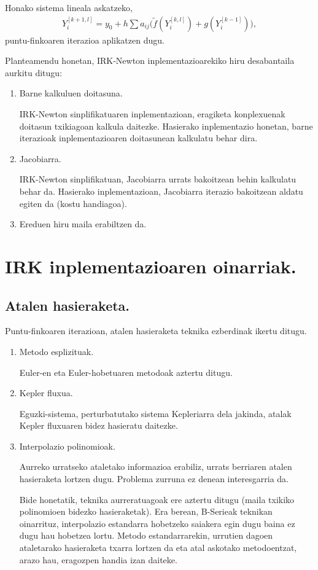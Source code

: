 Honako sistema lineala askatzeko,
\begin{align*}
Y_i^{[k+1,l]}=y_0+ h \sum a_{ij} \big( \tilde{f}(Y_i^{[k,l]})+g(Y_i^{[k-1]})),
\end{align*}
puntu-finkoaren iterazioa aplikatzen dugu.

Planteamendu honetan, IRK-Newton inplementazioarekiko hiru desabantaila aurkitu ditugu: 
\begin{enumerate}
\item Barne kalkuluen doitasuna. 

IRK-Newton sinplifikatuaren inplementazioan, eragiketa konplexuenak doitasun txikiagoan kalkula daitezke. Hasierako inplementazio honetan, barne iterazioak inplementazioaren doitasunean kalkulatu behar dira.

\item Jacobiarra.

IRK-Newton sinplifikatuan, Jacobiarra urrats bakoitzean behin kalkulatu behar da. Hasierako inplementazioan, Jacobiarra iterazio bakoitzean  aldatu egiten da (kostu handiagoa).
\item Ereduen hiru maila erabiltzen da.\\
\end{enumerate}

\section{IRK inplementazioaren oinarriak.}


\subsection*{Atalen hasieraketa.}

Puntu-finkoaren iterazioan, atalen hasieraketa teknika ezberdinak ikertu ditugu. 
\begin{enumerate}
\item Metodo esplizituak.

Euler-en eta Euler-hobetuaren metodoak aztertu ditugu.

\item Kepler fluxua.

Eguzki-sistema, perturbatutako sistema Kepleriarra dela jakinda, atalak Kepler fluxuaren bidez hasieratu daitezke.

\item Interpolazio polinomioak.

Aurreko urratseko ataletako informazioa erabiliz, urrats berriaren atalen hasieraketa lortzen dugu. Problema zurruna ez denean interesgarria da. 

Bide honetatik, teknika aurreratuagoak ere aztertu ditugu (maila txikiko polinomioen bidezko hasieraketak). Era berean, B-Serieak \cite{Chartier2010} teknikan oinarrituz, interpolazio estandarra \cite{Laburta1998} hobetzeko saiakera egin dugu baina ez dugu hau hobetzea lortu. Metodo estandarrarekin, urrutien dagoen ataletarako hasieraketa txarra lortzen da eta atal askotako metodoentzat, arazo hau, eragozpen handia izan daiteke.  

\end{enumerate}

